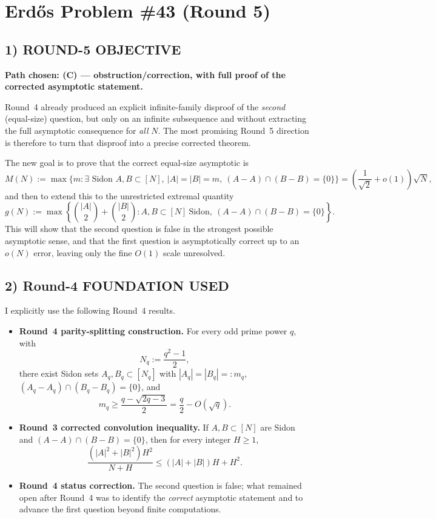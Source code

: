 \section{Erd\H{o}s Problem \#43 (Round 5)}

\subsection{1) ROUND-5 OBJECTIVE}

\textbf{Path chosen: (C) --- obstruction/correction, with full proof of the corrected asymptotic statement.}

Round~4 already produced an explicit infinite-family disproof of the \emph{second} (equal-size) question, but only on an infinite subsequence and without extracting the full asymptotic consequence for \emph{all} $N$.  The most promising Round~5 direction is therefore to turn that disproof into a precise corrected theorem.

The new goal is to prove that the correct equal-size asymptotic is
\[
M(N):=\max\bigl\{m:\exists\text{ Sidon }A,B\subset[N],\ |A|=|B|=m,\ (A-A)\cap(B-B)=\{0\}\bigr\}
=\left(\frac{1}{\sqrt2}+o(1)\right)\sqrt N,
\]
and then to extend this to the unrestricted extremal quantity
\[
g(N):=\max\left\{\binom{|A|}{2}+\binom{|B|}{2}: A,B\subset[N]\ \text{Sidon},\ (A-A)\cap(B-B)=\{0\}\right\}.
\]
This will show that the second question is false in the strongest possible asymptotic sense, and that the first question is asymptotically correct up to an $o(N)$ error, leaving only the fine $O(1)$ scale unresolved.

\subsection{2) Round-4 FOUNDATION USED}

I explicitly use the following Round~4 results.
\begin{itemize}
\item \textbf{Round~4 parity-splitting construction.} For every odd prime power $q$, with
\[
N_q:=\frac{q^2-1}{2},
\]
there exist Sidon sets $A_q,B_q\subset[N_q]$ with $|A_q|=|B_q|=:m_q$, $(A_q-A_q)\cap(B_q-B_q)=\{0\}$, and
\[
m_q\ge \frac{q-\sqrt{2q-3}}{2} = \frac q2-O(\sqrt q).
\]
\item \textbf{Round~3 corrected convolution inequality.} If $A,B\subset[N]$ are Sidon and $(A-A)\cap(B-B)=\{0\}$, then for every integer $H\ge 1$,
\[
\frac{(|A|^2+|B|^2)H^2}{N+H}\le (|A|+|B|)H+H^2.
\]
\item \textbf{Round~4 status correction.} The second question is false; what remained open after Round~4 was to identify the \emph{correct} asymptotic statement and to advance the first question beyond finite computations.
\end{itemize}

